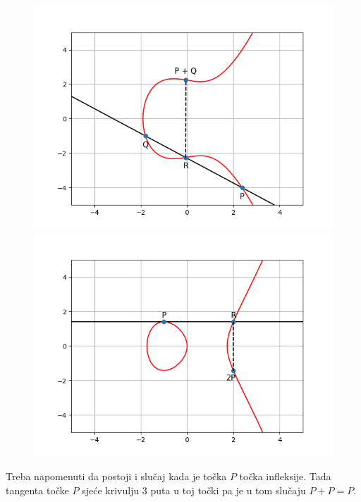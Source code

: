 \documentclass{mathos}
\begin{document}
\begin{figure}[H]
    \begin{minipage}[c]{0.5\linewidth}
        \centering
        \includegraphics[width=\linewidth,keepaspectratio]{5.png}
    \end{minipage}
    \begin{minipage}[c]{0.5\linewidth}
        \centering
        \includegraphics[width=\linewidth,keepaspectratio]{6.png}
    \end{minipage}
\end{figure}

\begin{nap}
    Treba napomenuti da postoji i slučaj kada je točka $P$ točka infleksije. Tada tangenta točke $P$ sjeće krivulju 3 puta u toj točki pa je u tom slučaju $P + P = P$.
\end{nap}
\end{document}
